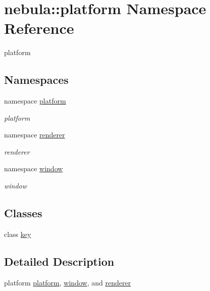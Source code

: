 \hypertarget{namespacenebula_1_1platform}{
\section{nebula::platform Namespace Reference}
\label{namespacenebula_1_1platform}
}


platform  
\subsection*{Namespaces}
\begin{DoxyCompactItemize}
\item 
namespace \hyperlink{namespacenebula_1_1platform_1_1platform}{platform}


\begin{DoxyCompactList}\small\item\em platform \item\end{DoxyCompactList}\item 
namespace \hyperlink{namespacenebula_1_1platform_1_1renderer}{renderer}


\begin{DoxyCompactList}\small\item\em renderer \item\end{DoxyCompactList}\item 
namespace \hyperlink{namespacenebula_1_1platform_1_1window}{window}


\begin{DoxyCompactList}\small\item\em window \item\end{DoxyCompactList}\end{DoxyCompactItemize}
\subsection*{Classes}
\begin{DoxyCompactItemize}
\item 
class \hyperlink{classnebula_1_1platform_1_1key}{key}
\end{DoxyCompactItemize}


\subsection{Detailed Description}
platform \hyperlink{namespacenebula_1_1platform_1_1platform}{platform}, \hyperlink{namespacenebula_1_1platform_1_1window}{window}, and \hyperlink{namespacenebula_1_1platform_1_1renderer}{renderer} 